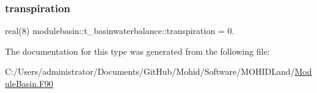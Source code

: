 \mbox{\label{structmodulebasin_1_1t__basinwaterbalance_a0902a07ff488ab981df08da0548e7368}} 
\subsubsection{\texorpdfstring{transpiration}{transpiration}}
{\footnotesize\ttfamily real(8) modulebasin\+::t\+\_\+basinwaterbalance\+::transpiration = 0.\hspace{0.3cm}{\ttfamily [private]}}



The documentation for this type was generated from the following file\+:\begin{DoxyCompactItemize}
\item 
C\+:/\+Users/administrator/\+Documents/\+Git\+Hub/\+Mohid/\+Software/\+M\+O\+H\+I\+D\+Land/\mbox{\hyperlink{_module_basin_8_f90}{Module\+Basin.\+F90}}\end{DoxyCompactItemize}
